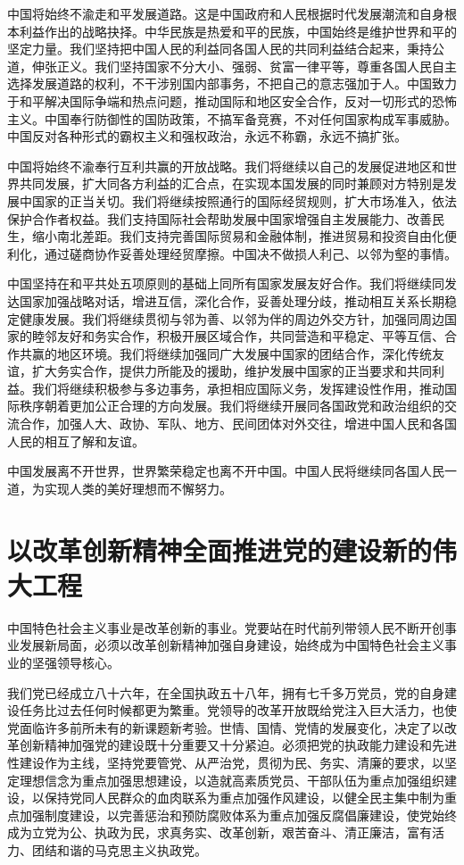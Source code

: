 中国将始终不渝走和平发展道路。这是中国政府和人民根据时代发展潮流和自身根本利益作出的战略抉择。中华民族是热爱和平的民族，中国始终是维护世界和平的坚定力量。我们坚持把中国人民的利益同各国人民的共同利益结合起来，秉持公道，伸张正义。我们坚持国家不分大小、强弱、贫富一律平等，尊重各国人民自主选择发展道路的权利，不干涉别国内部事务，不把自己的意志强加于人。中国致力于和平解决国际争端和热点问题，推动国际和地区安全合作，反对一切形式的恐怖主义。中国奉行防御性的国防政策，不搞军备竞赛，不对任何国家构成军事威胁。中国反对各种形式的霸权主义和强权政治，永远不称霸，永远不搞扩张。

中国将始终不渝奉行互利共赢的开放战略。我们将继续以自己的发展促进地区和世界共同发展，扩大同各方利益的汇合点，在实现本国发展的同时兼顾对方特别是发展中国家的正当关切。我们将继续按照通行的国际经贸规则，扩大市场准入，依法保护合作者权益。我们支持国际社会帮助发展中国家增强自主发展能力、改善民生，缩小南北差距。我们支持完善国际贸易和金融体制，推进贸易和投资自由化便利化，通过磋商协作妥善处理经贸摩擦。中国决不做损人利己、以邻为壑的事情。

中国坚持在和平共处五项原则的基础上同所有国家发展友好合作。我们将继续同发达国家加强战略对话，增进互信，深化合作，妥善处理分歧，推动相互关系长期稳定健康发展。我们将继续贯彻与邻为善、以邻为伴的周边外交方针，加强同周边国家的睦邻友好和务实合作，积极开展区域合作，共同营造和平稳定、平等互信、合作共赢的地区环境。我们将继续加强同广大发展中国家的团结合作，深化传统友谊，扩大务实合作，提供力所能及的援助，维护发展中国家的正当要求和共同利益。我们将继续积极参与多边事务，承担相应国际义务，发挥建设性作用，推动国际秩序朝着更加公正合理的方向发展。我们将继续开展同各国政党和政治组织的交流合作，加强人大、政协、军队、地方、民间团体对外交往，增进中国人民和各国人民的相互了解和友谊。

中国发展离不开世界，世界繁荣稳定也离不开中国。中国人民将继续同各国人民一道，为实现人类的美好理想而不懈努力。

\section{以改革创新精神全面推进党的建设新的伟大工程}

中国特色社会主义事业是改革创新的事业。党要站在时代前列带领人民不断开创事业发展新局面，必须以改革创新精神加强自身建设，始终成为中国特色社会主义事业的坚强领导核心。

我们党已经成立八十六年，在全国执政五十八年，拥有七千多万党员，党的自身建设任务比过去任何时候都更为繁重。党领导的改革开放既给党注入巨大活力，也使党面临许多前所未有的新课题新考验。世情、国情、党情的发展变化，决定了以改革创新精神加强党的建设既十分重要又十分紧迫。必须把党的执政能力建设和先进性建设作为主线，坚持党要管党、从严治党，贯彻为民、务实、清廉的要求，以坚定理想信念为重点加强思想建设，以造就高素质党员、干部队伍为重点加强组织建设，以保持党同人民群众的血肉联系为重点加强作风建设，以健全民主集中制为重点加强制度建设，以完善惩治和预防腐败体系为重点加强反腐倡廉建设，使党始终成为立党为公、执政为民，求真务实、改革创新，艰苦奋斗、清正廉洁，富有活力、团结和谐的马克思主义执政党。

